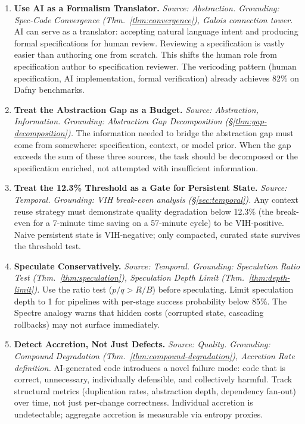 \documentclass[11pt, a4paper, logo, copyright]{googledeepmind}
\begin{document}
\begin{enumerate}[label=\textbf{P\arabic*.}, leftmargin=3em, resume]

\item \textbf{Use AI as a Formalism Translator.}
\emph{Source: Abstraction. Grounding: Spec-Code Convergence (Thm.~\ref{thm:convergence}), Galois connection tower.}
AI can serve as a translator: accepting natural language intent and producing formal specifications for human review. Reviewing a specification is vastly easier than authoring one from scratch. This shifts the human role from specification author to specification reviewer. The vericoding pattern (human specification, AI implementation, formal verification) already achieves 82\% on Dafny benchmarks.

\item \textbf{Treat the Abstraction Gap as a Budget.}
\emph{Source: Abstraction, Information. Grounding: Abstraction Gap Decomposition (\S\ref{thm:gap-decomposition}).}
The information needed to bridge the abstraction gap must come from somewhere: specification, context, or model prior. When the gap exceeds the sum of these three sources, the task should be decomposed or the specification enriched, not attempted with insufficient information.

\item \textbf{Treat the 12.3\% Threshold as a Gate for Persistent State.}
\emph{Source: Temporal. Grounding: VIH break-even analysis (\S\ref{sec:temporal}).}
Any context reuse strategy must demonstrate quality degradation below 12.3\% (the break-even for a 7-minute time saving on a 57-minute cycle) to be VIH-positive. Naive persistent state is VIH-negative; only compacted, curated state survives the threshold test.

\item \textbf{Speculate Conservatively.}
\emph{Source: Temporal. Grounding: Speculation Ratio Test (Thm.~\ref{thm:speculation}), Speculation Depth Limit (Thm.~\ref{thm:depth-limit}).}
Use the ratio test ($p/q > R/B$) before speculating. Limit speculation depth to 1 for pipelines with per-stage success probability below 85\%. The Spectre analogy warns that hidden costs (corrupted state, cascading rollbacks) may not surface immediately.

\item \textbf{Detect Accretion, Not Just Defects.}
\emph{Source: Quality. Grounding: Compound Degradation (Thm.~\ref{thm:compound-degradation}), Accretion Rate definition.}
AI-generated code introduces a novel failure mode: code that is correct, unnecessary, individually defensible, and collectively harmful. Track structural metrics (duplication rates, abstraction depth, dependency fan-out) over time, not just per-change correctness. Individual accretion is undetectable; aggregate accretion is measurable via entropy proxies.


\end{enumerate}
\end{document}
